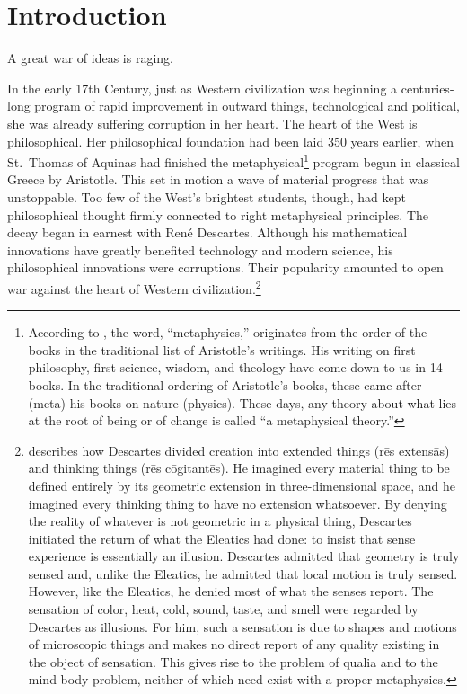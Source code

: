 \documentclass[twocolumn]{article}
\begin{document}
\thispagestyle{fancy}

\section{Introduction}

A great war of ideas is raging.

In the early 17th Century, just as Western civilization was beginning a
centuries-long program of rapid improvement in outward things, technological
and political, she was already suffering corruption in her heart.  The heart of
the West is philosophical.  Her philosophical foundation had been laid 350
years earlier, when St.~Thomas of Aquinas had finished the
metaphysical\footnote{%
   According to \cite{vis2017}, the word, ``metaphysics,'' originates from the
   order of the books in the traditional list of Aristotle's writings.  His
   writing on first philosophy, first science, wisdom, and theology have come
   down to us in 14 books.  In the traditional ordering of Aristotle's books,
   these came after (meta) his books on nature (physics).  These days, any
   theory about what lies at the root of being or of change is called ``a
   metaphysical theory.''%
}
program begun in classical Greece by Aristotle.  This set in motion a wave of
material progress that was unstoppable.  Too few of the West's brightest
students, though, had kept philosophical thought firmly connected to right
metaphysical principles.  The decay began in earnest with Ren\'e Descartes.
Although his mathematical innovations have greatly benefited technology and
modern science, his philosophical innovations were corruptions.  Their
popularity amounted to open war against the heart of Western
civilization.\footnote{%
   \citet[Chapter IV]{b1954} describes how Descartes divided creation into
   extended things (r\={e}s extens\={a}s) and thinking things (r\={e}s
   c\={o}gitant\={e}s). He imagined every material thing to be defined entirely
   by its geometric extension in three-dimensional space, and he imagined every
   thinking thing to have no extension whatsoever.  By denying the reality of
   whatever is not geometric in a physical thing, Descartes initiated the
   return of what the Eleatics had done: to insist that sense experience is
   essentially an illusion.  Descartes admitted that geometry is truly sensed
   and, unlike the Eleatics, he admitted that local motion is truly sensed.
   However, like the Eleatics, he denied most of what the senses report. The
   sensation of color, heat, cold, sound, taste, and smell were regarded by
   Descartes as illusions.  For him, such a sensation is due to shapes and
   motions of microscopic things and makes no direct report of any quality
   existing in the object of sensation.  This gives rise to the problem of
   qualia and to the mind-body problem, neither of which need exist with a
   proper metaphysics.
}
\end{document}

